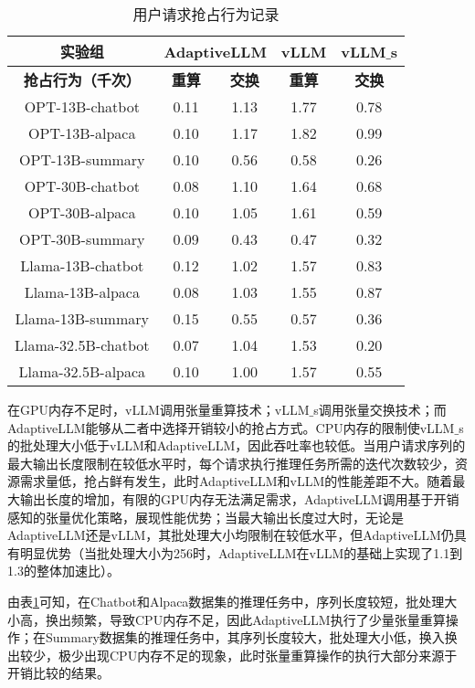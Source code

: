 \begin{table}[H]
  \centering
  \caption{用户请求抢占行为记录}
  \label{Table:用户请求抢占行为记录}
  \renewcommand{\arraystretch}{1.25}
  \small
  \begin{tabular}{c c c c c}
    \toprule
    \textbf{实验组} & \multicolumn{2}{c}{\textbf{AdaptiveLLM}} & \textbf{vLLM} & \textbf{vLLM$\_$s} \\
    \midrule
    \textbf{抢占行为（千次）} & \textbf{重算} & \textbf{交换} & \textbf{重算} & \textbf{交换} \\
    \midrule
    OPT-13B-chatbot & 0.11 & 1.13 & 1.77 & 0.78 \\
    OPT-13B-alpaca & 0.10 & 1.17 & 1.82 & 0.99 \\
    OPT-13B-summary & 0.10 & 0.56 & 0.58 & 0.26 \\
    OPT-30B-chatbot & 0.08 & 1.10 & 1.64 & 0.68 \\
    OPT-30B-alpaca & 0.10 & 1.05 & 1.61 & 0.59 \\
    OPT-30B-summary & 0.09 & 0.43 & 0.47 & 0.32 \\
    Llama-13B-chatbot & 0.12 & 1.02 & 1.57 & 0.83 \\
    Llama-13B-alpaca & 0.08 & 1.03 & 1.55 & 0.87 \\
    Llama-13B-summary & 0.15 & 0.55 & 0.57 & 0.36 \\
    Llama-32.5B-chatbot & 0.07 & 1.04 & 1.53 & 0.20 \\
    Llama-32.5B-alpaca & 0.10 & 1.00 & 1.57 & 0.55 \\
    \bottomrule
  \end{tabular}
\end{table}

在GPU内存不足时，vLLM调用张量重算技术；vLLM$\_$s调用张量交换技术；而AdaptiveLLM能够从二者中选择开销较小的抢占方式。CPU内存的限制使vLLM$\_$s的批处理大小低于vLLM和AdaptiveLLM，因此吞吐率也较低。当用户请求序列的最大输出长度限制在较低水平时，每个请求执行推理任务所需的迭代次数较少，资源需求量低，抢占鲜有发生，此时AdaptiveLLM和vLLM的性能差距不大。随着最大输出长度的增加，有限的GPU内存无法满足需求，AdaptiveLLM调用基于开销感知的张量优化策略，展现性能优势；当最大输出长度过大时，无论是AdaptiveLLM还是vLLM，其批处理大小均限制在较低水平，但AdaptiveLLM仍具有明显优势（当批处理大小为256时，AdaptiveLLM在vLLM的基础上实现了1.1到1.3的整体加速比）。 \par

由表\ref{Table:用户请求抢占行为记录}可知，在Chatbot和Alpaca数据集的推理任务中，序列长度较短，批处理大小高，换出频繁，导致CPU内存不足，因此AdaptiveLLM执行了少量张量重算操作；在Summary数据集的推理任务中，其序列长度较大，批处理大小低，换入换出较少，极少出现CPU内存不足的现象，此时张量重算操作的执行大部分来源于开销比较的结果。 \par

